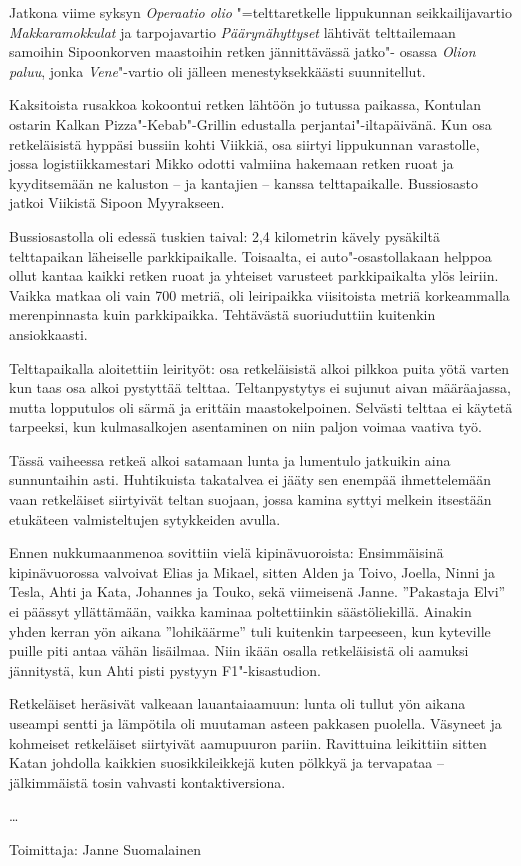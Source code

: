 \documentclass[10pt,finnish,a5paper,headings=small,twoside=semi]{scrartcl}
\begin{document}
\begin{multicols}{2}

	\noindent Jatkona viime syksyn \textit{Operaatio olio} "=telttaretkelle lippukunnan
	seikkailijavartio \textit{Makkaramokkulat} ja tarpojavartio \textit{Päärynähyttyset} lähtivät
	telttailemaan samoihin Sipoonkorven maastoihin retken jännittävässä jatko"-
	osassa \textit{Olion paluu}, jonka \textit{Vene}"-vartio oli jälleen menestyksekkäästi
	suunnitellut.

	Kaksitoista rusakkoa kokoontui retken lähtöön jo tutussa paikassa, Kontulan
	ostarin Kalkan Pizza"-Kebab"-Grillin edustalla perjantai"-iltapäivänä. Kun osa
	retkeläisistä hyppäsi bussiin kohti Viikkiä, osa siirtyi lippukunnan
	varastolle, jossa logistiikkamestari Mikko odotti valmiina hakemaan retken
	ruoat ja kyyditsemään ne kaluston -- ja kantajien -- kanssa telttapaikalle.
	Bussiosasto jatkoi Viikistä Sipoon Myyrakseen.

	Bussiosastolla oli edessä tuskien taival: 2,4 kilometrin kävely pysäkiltä
	telttapaikan läheiselle parkkipaikalle. Toisaalta, ei auto"-osastollakaan
	helppoa ollut kantaa kaikki retken ruoat ja yhteiset varusteet parkkipaikalta
	ylös leiriin. Vaikka matkaa oli vain 700 metriä, oli leiripaikka viisitoista
	metriä korkeammalla merenpinnasta kuin parkkipaikka. Tehtävästä suoriuduttiin
	kuitenkin ansiokkaasti.

	Telttapaikalla aloitettiin leirityöt: osa retkeläisistä alkoi pilkkoa puita
	yötä varten kun taas osa alkoi pystyttää telttaa. Teltanpystytys ei sujunut
	aivan määräajassa, mutta lopputulos oli särmä ja erittäin maastokelpoinen.
	Selvästi telttaa ei käytetä tarpeeksi, kun kulmasalkojen asentaminen on niin
	paljon voimaa vaativa työ.

	Tässä vaiheessa retkeä alkoi satamaan lunta ja lumentulo jatkuikin aina
	sunnuntaihin asti. Huhtikuista takatalvea ei jääty sen enempää ihmettelemään
	vaan retkeläiset siirtyivät teltan suojaan, jossa kamina syttyi melkein
	itsestään etukäteen valmisteltujen sytykkeiden avulla.

	Ennen nukkumaanmenoa sovittiin vielä kipinävuoroista: Ensimmäisinä
	kipinävuorossa valvoivat Elias ja Mikael, sitten Alden ja Toivo, Joella, Ninni
	ja Tesla, Ahti ja Kata, Johannes ja Touko, sekä viimeisenä Janne. ''Pakastaja
	Elvi'' ei päässyt yllättämään, vaikka kaminaa poltettiinkin säästöliekillä.
	Ainakin yhden kerran yön aikana ''lohikäärme'' tuli kuitenkin tarpeeseen, kun
	kyteville puille piti antaa vähän lisäilmaa. Niin ikään osalla retkeläisistä
	oli aamuksi jännitystä, kun Ahti pisti pystyyn F1"-kisastudion.

	Retkeläiset heräsivät valkeaan lauantaiaamuun: lunta oli tullut yön aikana
	useampi sentti ja lämpötila oli muutaman asteen pakkasen puolella. Väsyneet ja
	kohmeiset retkeläiset siirtyivät aamupuuron pariin. Ravittuina leikittiin
	sitten Katan johdolla kaikkien suosikkileikkejä kuten pölkkyä ja tervapataa --
	jälkimmäistä tosin vahvasti kontaktiversiona.

	\ldots

	\raggedleft Toimittaja: Janne Suomalainen\\

\end{multicols}
\end{document}
